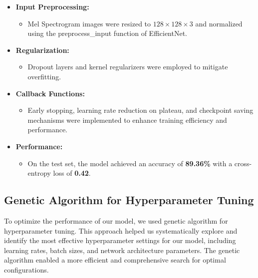 \begin{itemize}
    \item \textbf{Input Preprocessing:}
          \begin{itemize}
              \item Mel Spectrogram images were resized to \(128 \times 128 \times 3\) and
                    normalized using the preprocess\_input function of EfficientNet.
          \end{itemize}

    \item \textbf{Regularization:}
          \begin{itemize}
              \item Dropout layers and kernel regularizers were employed to mitigate overfitting.
          \end{itemize}

    \item \textbf{Callback Functions:}
          \begin{itemize}
              \item Early stopping, learning rate reduction on plateau, and checkpoint saving
                    mechanisms were implemented to enhance training efficiency and performance.
          \end{itemize}

    \item \textbf{Performance:}
          \begin{itemize}
              \item On the test set, the model achieved an accuracy of \textbf{89.36\%} with a
                    cross-entropy loss of \textbf{0.42}.
          \end{itemize}
\end{itemize}

\subsection{Genetic Algorithm for Hyperparameter Tuning}
To optimize the performance of our model, we used genetic algorithm for
hyperparameter tuning. This approach helped us systematically explore and
identify the most effective hyperparameter settings for our model, including
learning rates, batch sizes, and network architecture parameters. The genetic
algorithm enabled a more efficient and comprehensive search for optimal
configurations.

